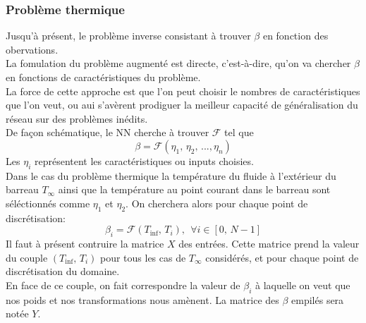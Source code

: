 \documentclass[a4paper,12pt]{article}
\newcommand{\bepar}[1]{
	\left( #1 \right)  
}
\newcommand{\becro}[1]{
	\left[ #1 \right]  
}
\newcommand{\tinf}{$T_\infty$}
\newcommand\bk{\color{black}}
\newcommand\dsb{\color{dsb}}
\newcommand{\cad}{c'est-à-dire}
\numberwithin{equation}{section} %
\begin{document}
\dsb \subsubsection{Problème thermique} \bk
Jusqu'à présent, le problème inverse consistant à trouver $\beta$ en fonction des obervations. \\
La fomulation du problème augmenté est directe, \cad  $ $, qu'on va chercher $\beta$ en fonctions de caractéristiques du problème.\\
La force de cette approche est que l'on peut choisir le nombres de caractéristiques que l'on veut, ou aui s'avèrent prodiguer la meilleur capacité de généralisation du réseau sur des problèmes inédits.\\
De façon schématique, le NN cherche à trouver $\mathcal{F}$ tel que 
\begin{equation}
\beta = \mathcal{F}\bepar{\eta_1,\,\eta_2,\, ...,\eta_n}
\end{equation}
Les $\eta_i$ représentent les caractéristiques ou inputs choisies.\\
Dans le cas du problème thermique la température du fluide à l'extérieur du barreau \tinf $ $ ainsi que la température au point courant dans le barreau sont séléctionnés comme $\eta_1$ et $\eta_2$. On cherchera alors pour chaque point de discrétisation:
\begin{equation}
\beta_i = \mathcal{F}\bepar{T_{\text{inf}}, \, T_i}, \ \ \forall i \in \becro{0,\, N-1} 
\end{equation}
Il faut à présent contruire la matrice $X$ des entrées. Cette matrice prend la valeur du couple $\bepar{T_{\text{inf}}, \, T_i}$ pour tous les cas de \tinf $ $ considérés, et pour chaque point de discrétisation du domaine.\\
En face de ce couple, on fait correspondre la valeur de $\beta_i$ à laquelle on veut que nos poids et nos transformations nous amènent. La matrice des $\beta$ empilés sera notée $Y$.\\
\end{document}

